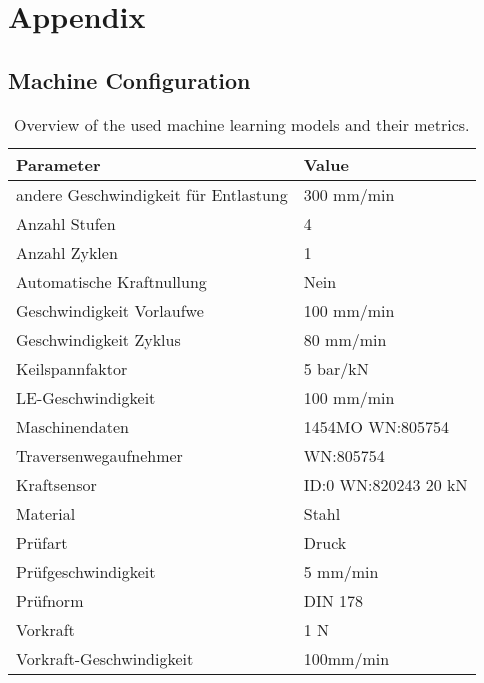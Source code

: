 \chapter{Appendix}\label{ch:appendix}

\section*{Machine Configuration}\label{sec:machine-configuration}

\begin{table}[H]
    \begin{tcolorbox}[arc=0pt,boxrule=0.5pt]
        \centering
        \begin{tabular}{ll}
            \toprule
            \textbf{Parameter} & \textbf{Value}
            \\
            \toprule
            andere Geschwindigkeit für Entlastung & 300 mm/min           \\
            Anzahl Stufen                         & 4                    \\
            Anzahl Zyklen                         & 1                    \\
            Automatische Kraftnullung             & Nein                 \\
            Geschwindigkeit Vorlaufwe             & 100 mm/min           \\
            Geschwindigkeit Zyklus                & 80 mm/min            \\
            Keilspannfaktor                       & 5 bar/kN             \\
            LE-Geschwindigkeit                    & 100 mm/min           \\
            \hdashline
            Maschinendaten                        & 1454MO WN:805754     \\
            Traversenwegaufnehmer                 & WN:805754            \\
            Kraftsensor                           & ID:0 WN:820243 20 kN \\
            \hdashline
            Material                              & Stahl                \\
            Prüfart                               & Druck                \\
            Prüfgeschwindigkeit                   & 5 mm/min             \\
            Prüfnorm                              & DIN 178              \\
            Vorkraft                              & 1 N                  \\
            Vorkraft-Geschwindigkeit              & 100mm/min            \\
            \bottomrule
        \end{tabular}
    \end{tcolorbox}
    \caption{Overview of the used machine learning models and their metrics.}
    \label{tab:machine-config}
\end{table}


